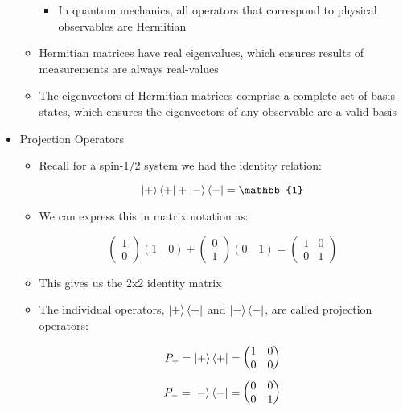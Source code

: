 \begin{itemize}
\begin{itemize}
\begin{itemize}
          \item In quantum mechanics, all operators that correspond to physical observables are Hermitian

        \end{itemize}

      \item Hermitian matrices have real eigenvalues, which ensures results of measurements are always real-values

      \item The eigenvectors of Hermitian matrices comprise a complete set of basis states, which ensures the eigenvectors of any observable are a valid basis

    \end{itemize}

  \item Projection Operators

    \begin{itemize}

      \item Recall for a spin-1/2 system we had the identity relation:

        $$\ket{+}\bra{+}+\ket{-}\bra{-}=\mathbb{1}$$

      \item We can express this in matrix notation as:

        $$\left( \begin{matrix}1\\0\end{matrix} \right)(1\quad 0)+\left( \begin{matrix}0\\1\end{matrix} \right)(0\quad 1)=\left( \begin{matrix}1 & 0\\0 & 1\end{matrix} \right)$$

      \item This gives us the 2x2 identity matrix

      \item The individual operators, $\ket{+}\bra{+}$ and $\ket{-}\bra{-}$, are called projection operators:

        $$P_+=\ket{+}\bra{+}=\left( \begin{matrix}1&0\\0&0\end{matrix} \right)$$
        $$P_-=\ket{-}\bra{-}=\left( \begin{matrix}0&0\\0&1\end{matrix} \right)$$


\end{itemize}
\end{itemize}

